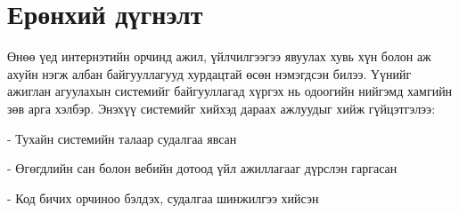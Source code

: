 \section{Ерөнхий дүгнэлт}
\qquad Өнөө үед интернэтийн орчинд ажил, үйлчилгээгээ явуулах хувь хүн болон аж ахуйн нэгж албан байгууллагууд хурдацтай өсөн нэмэгдсэн билээ. Үүнийг ажиглан агуулахын 
системийг байгууллагад хүргэх нь одоогийн нийгэмд хамгийн зөв арга хэлбэр. Энэхүү системийг хийхэд дараах ажлуудыг хийж гүйцэтгэлээ:

-	Тухайн системийн талаар судалгаа явсан

-	Өгөгдлийн сан болон вебийн дотоод үйл ажиллагааг дүрслэн гаргасан

-	Код бичих орчиноо бэлдэх, судалгаа шинжилгээ хийсэн










	

	
	

